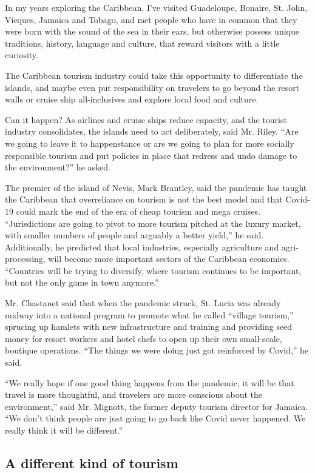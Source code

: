 In my years exploring the Caribbean, I've visited Guadeloupe, Bonaire,
St. John, Vieques, Jamaica and Tobago, and met people who have in common
that they were born with the sound of the sea in their ears, but
otherwise possess unique traditions, history, language and culture, that
reward visitors with a little curiosity.

The Caribbean tourism industry could take this opportunity to
differentiate the islands, and maybe even put responsibility on
travelers to go beyond the resort walls or cruise ship all-inclusives
and explore local food and culture.

Can it happen? As airlines and cruise ships reduce capacity, and the
tourist industry consolidates, the islands need to act deliberately,
said Mr. Riley. ``Are we going to leave it to happenstance or are we
going to plan for more socially responsible tourism and put policies in
place that redress and undo damage to the environment?'' he asked.

The premier of the island of Nevis, Mark Brantley, said the pandemic has
taught the Caribbean that overreliance on tourism is not the best model
and that Covid-19 could mark the end of the era of cheap tourism and
mega cruises. ``Jurisdictions are going to pivot to more tourism pitched
at the luxury market, with smaller numbers of people and arguably a
better yield,'' he said. Additionally, he predicted that local
industries, especially agriculture and agri-processing, will become more
important sectors of the Caribbean economies. ``Countries will be trying
to diversify, where tourism continues to be important, but not the only
game in town anymore.''

Mr. Chastanet said that when the pandemic struck, St. Lucia was already
midway into a national program to promote what he called ``village
tourism,'' sprucing up hamlets with new infrastructure and training and
providing seed money for resort workers and hotel chefs to open up their
own small-scale, boutique operations. ``The things we were doing just
got reinforced by Covid,'' he said.

``We really hope if one good thing happens from the pandemic, it will be
that travel is more thoughtful, and travelers are more conscious about
the environment,'' said Mr. Mignott, the former deputy tourism director
for Jamaica. ``We don't think people are just going to go back like
Covid never happened. We really think it will be different.''

\hypertarget{a-different-kind-of-tourism}{%
\subsection{A different kind of
tourism}\label{a-different-kind-of-tourism}}

